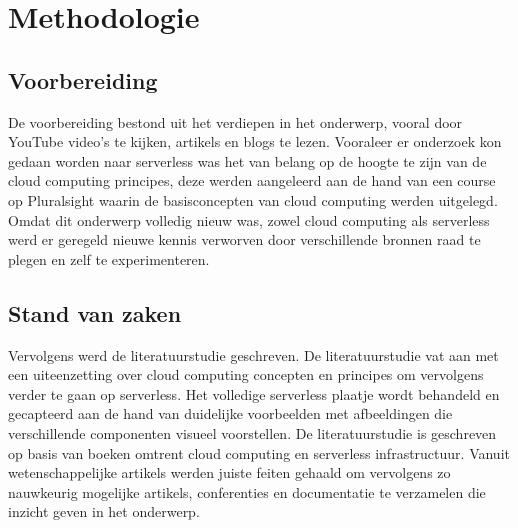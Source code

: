
\chapter{Methodologie}
\label{ch:methodologie}


\section{Voorbereiding}
De voorbereiding bestond uit het verdiepen in het onderwerp, vooral door YouTube video's te kijken, artikels en blogs te lezen. Vooraleer er onderzoek kon gedaan worden naar serverless was het van belang op de hoogte te zijn van de cloud computing principes, deze werden aangeleerd aan de hand van een course op Pluralsight waarin de basisconcepten van cloud computing werden uitgelegd. Omdat dit onderwerp volledig nieuw was, zowel cloud computing als serverless werd er geregeld nieuwe kennis verworven door verschillende bronnen raad te plegen en zelf te experimenteren.

\section{Stand van zaken}
Vervolgens werd de literatuurstudie geschreven. De literatuurstudie vat aan met een uiteenzetting over cloud computing concepten en principes om vervolgens verder te gaan op serverless. Het volledige serverless plaatje wordt behandeld en gecapteerd aan de hand van duidelijke voorbeelden met afbeeldingen die verschillende componenten visueel voorstellen. De literatuurstudie is geschreven op basis van boeken omtrent cloud computing en serverless infrastructuur. Vanuit wetenschappelijke artikels werden juiste feiten gehaald om vervolgens zo nauwkeurig mogelijke artikels, conferenties en documentatie te verzamelen die inzicht geven in het onderwerp.

